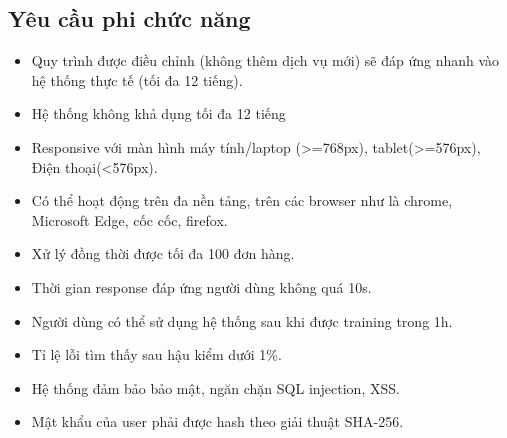    \subsection{Yêu cầu phi chức năng}
        \begin{itemize}
            \item Quy trình được điều chỉnh (không thêm dịch vụ mới) sẽ đáp ứng nhanh vào hệ thống thực tế (tối đa 12 tiếng).
            \item Hệ thống không khả dụng tối đa 12 tiếng
            \item Responsive với màn hình máy tính/laptop (>=768px), tablet(>=576px), Điện thoại(<576px).
            \item Có thể hoạt động trên đa nền tảng, trên các browser như là chrome, Microsoft Edge, cốc cốc, firefox.
            \item Xử lý đồng thời được tối đa 100 đơn hàng.
            \item Thời gian response đáp ứng người dùng không quá 10s.
            \item Người dùng có thể sử dụng hệ thống sau khi được training trong 1h.
            \item Tỉ lệ lỗi tìm thấy sau hậu kiểm dưới 1\%.
            \item Hệ thống đảm bảo bảo mật, ngăn chặn SQL injection, XSS.
            \item Mật khẩu của user phải được hash theo giải thuật SHA-256.
    
        \end{itemize}